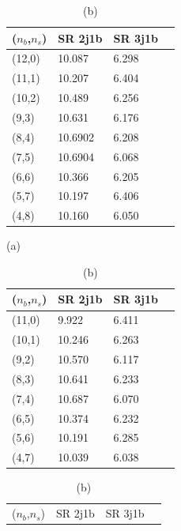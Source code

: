 \begin{table}[!h]
\centering
\begin{minipage}{.37\textwidth}
\begin{tabular}{@{} *4l @{}}
 \toprule
($n_{b}$,$n_{s}$) & SR 2j1b & SR 3j1b \\[0.2ex] 
 \midrule  
  (12,0) & 10.087 & 6.298 \\[0.2ex]
      (11,1) & 10.207 & 6.404 \\[0.2ex]
      (10,2) & 10.489 & 6.256 \\[0.2ex]
      (9,3) & 10.631 & 6.176 \\[0.2ex]
      (8,4) & 10.6902 & 6.208 \\[0.2ex]
      (7,5) & 10.6904 & 6.068 \\[0.2ex]
      (6,6) & 10.366 & 6.205 \\[0.2ex]
      (5,7) & 10.197 & 6.406 \\[0.2ex]
      (4,8) & 10.160 & 6.050 \\[0.2ex]
 \bottomrule
 \end{tabular}
 \caption*{(a)}
\end{minipage}%
\vspace*{0.4cm}
\centering
\begin{minipage}{.37\textwidth}
\begin{tabular}{@{} *4l @{}}
\toprule
($n_{b}$,$n_{s}$) & SR 2j1b & SR 3j1b \\[0.2ex] 
\midrule
     (11,0) & 9.922 & 6.411 \\[0.2ex] 
      (10,1) & 10.246 & 6.263 \\[0.2ex] 
      (9,2) & 10.570 & 6.117 \\[0.2ex] 
      (8,3) & 10.641 & 6.233 \\[0.2ex] 
      (7,4) & 10.687 & 6.070 \\[0.2ex] 
      (6,5) & 10.374 & 6.232 \\[0.2ex] 
      (5,6) & 10.191 &  6.285 \\[0.2ex] 
      (4,7) & 10.039 &  6.038 \\[0.2ex] 
\bottomrule
\end{tabular} 
\caption*{(b)}
\end{minipage} 
\newline
\centering
\begin{minipage}{.37\textwidth}
\begin{tabular}{@{} *4l @{}}
 \toprule
 ($n_{b}$,$n_{s}$) & SR 2j1b & SR 3j1b \\[0.2ex] 

\end{tabular}
\end{minipage}
\end{table}
